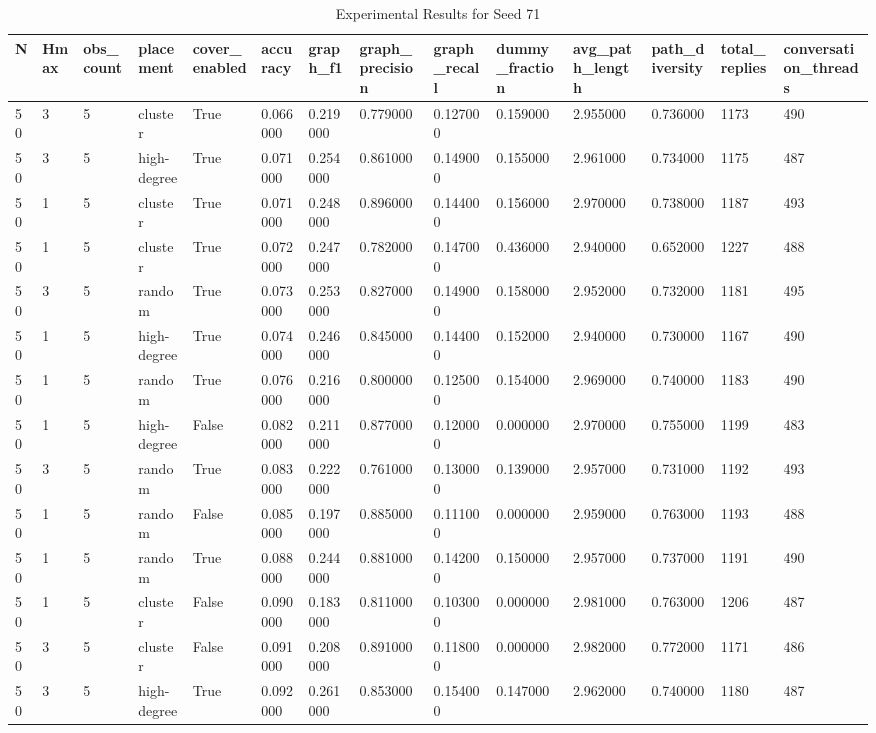 \begin{table}
\caption{Experimental Results for Seed 71}
\label{tab:results_seed_71}
\begin{tabular}{llllllllllllll}
\toprule
N & Hmax & obs_count & placement & cover_enabled & accuracy & graph_f1 & graph_precision & graph_recall & dummy_fraction & avg_path_length & path_diversity & total_replies & conversation_threads \\
\midrule
50 & 3 & 5 & cluster & True & 0.066000 & 0.219000 & 0.779000 & 0.127000 & 0.159000 & 2.955000 & 0.736000 & 1173 & 490 \\
50 & 3 & 5 & high-degree & True & 0.071000 & 0.254000 & 0.861000 & 0.149000 & 0.155000 & 2.961000 & 0.734000 & 1175 & 487 \\
50 & 1 & 5 & cluster & True & 0.071000 & 0.248000 & 0.896000 & 0.144000 & 0.156000 & 2.970000 & 0.738000 & 1187 & 493 \\
50 & 1 & 5 & cluster & True & 0.072000 & 0.247000 & 0.782000 & 0.147000 & 0.436000 & 2.940000 & 0.652000 & 1227 & 488 \\
50 & 3 & 5 & random & True & 0.073000 & 0.253000 & 0.827000 & 0.149000 & 0.158000 & 2.952000 & 0.732000 & 1181 & 495 \\
50 & 1 & 5 & high-degree & True & 0.074000 & 0.246000 & 0.845000 & 0.144000 & 0.152000 & 2.940000 & 0.730000 & 1167 & 490 \\
50 & 1 & 5 & random & True & 0.076000 & 0.216000 & 0.800000 & 0.125000 & 0.154000 & 2.969000 & 0.740000 & 1183 & 490 \\
50 & 1 & 5 & high-degree & False & 0.082000 & 0.211000 & 0.877000 & 0.120000 & 0.000000 & 2.970000 & 0.755000 & 1199 & 483 \\
50 & 3 & 5 & random & True & 0.083000 & 0.222000 & 0.761000 & 0.130000 & 0.139000 & 2.957000 & 0.731000 & 1192 & 493 \\
50 & 1 & 5 & random & False & 0.085000 & 0.197000 & 0.885000 & 0.111000 & 0.000000 & 2.959000 & 0.763000 & 1193 & 488 \\
50 & 1 & 5 & random & True & 0.088000 & 0.244000 & 0.881000 & 0.142000 & 0.150000 & 2.957000 & 0.737000 & 1191 & 490 \\
50 & 1 & 5 & cluster & False & 0.090000 & 0.183000 & 0.811000 & 0.103000 & 0.000000 & 2.981000 & 0.763000 & 1206 & 487 \\
50 & 3 & 5 & cluster & False & 0.091000 & 0.208000 & 0.891000 & 0.118000 & 0.000000 & 2.982000 & 0.772000 & 1171 & 486 \\
50 & 3 & 5 & high-degree & True & 0.092000 & 0.261000 & 0.853000 & 0.154000 & 0.147000 & 2.962000 & 0.740000 & 1180 & 487 \\

\end{tabular}
\end{table}
